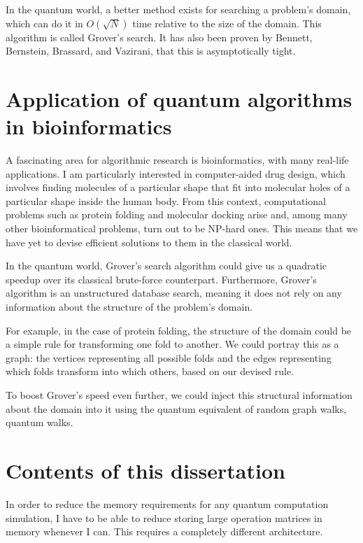 In the quantum world, a better method exists for searching a problem's domain, which can do it in $O(\sqrt{N})$ time relative to the size of the domain. This algorithm is called Grover's search. It has also been proven by Bennett, Bernstein, Brassard, and Vazirani, that this is asymptotically tight\cite{bennett_strengths_1997}.

\section{Application of quantum algorithms in bioinformatics}

A fascinating area for algorithmic research is bioinformatics, with many real-life applications. I am particularly interested in computer-aided drug design, which involves finding molecules of a particular shape that fit into molecular holes of a particular shape inside the human body. From this context, computational problems such as protein folding\cite{crescenzi_complexity_1998} and molecular docking\cite{a_molecular_2018} arise and, among many other bioinformatical problems, turn out to be NP-hard ones. This means that we have yet to devise efficient solutions to them in the classical world.

In the quantum world, Grover's search algorithm could give us a quadratic speedup over its classical brute-force counterpart. Furthermore, Grover's algorithm is an unstructured database search, meaning it does not rely on any information about the structure of the problem's domain.

For example, in the case of protein folding, the structure of the domain could be a simple rule for transforming one fold to another. We could portray this as a graph: the vertices representing all possible folds and the edges representing which folds transform into which others, based on our devised rule.

To boost Grover's speed even further, we could inject this structural information about the domain into it using the quantum equivalent of random graph walks, quantum walks.

\section{Contents of this dissertation}


In order to reduce the memory requirements for any quantum computation simulation, I have to be able to reduce storing large operation matrices in memory whenever I can. This requires a completely different architecture.

